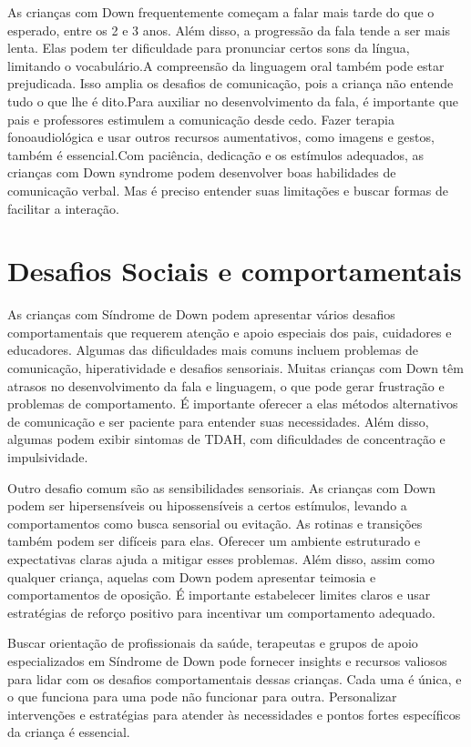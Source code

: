 As crianças com Down frequentemente começam a falar mais tarde do que o esperado, entre os 2 e 3 anos. Além disso, a progressão da fala tende a ser mais lenta. Elas podem ter dificuldade para pronunciar certos sons da língua, limitando o vocabulário.A compreensão da linguagem oral também pode estar prejudicada. Isso amplia os desafios de comunicação, pois a criança não entende tudo o que lhe é dito.Para auxiliar no desenvolvimento da fala, é importante que pais e professores estimulem a comunicação desde cedo. Fazer terapia fonoaudiológica e usar outros recursos aumentativos, como imagens e gestos, também é essencial.Com paciência, dedicação e os estímulos adequados, as crianças com Down syndrome podem desenvolver boas habilidades de comunicação verbal. Mas é preciso entender suas limitações e buscar formas de facilitar a interação.

\section{Desafios Sociais e comportamentais}


As crianças com Síndrome de Down podem apresentar vários desafios comportamentais que requerem atenção e apoio especiais dos pais, cuidadores e educadores. Algumas das dificuldades mais comuns incluem problemas de comunicação, hiperatividade e desafios sensoriais. Muitas crianças com Down têm atrasos no desenvolvimento da fala e linguagem, o que pode gerar frustração e problemas de comportamento. É importante oferecer a elas métodos alternativos de comunicação e ser paciente para entender suas necessidades. Além disso, algumas podem exibir sintomas de TDAH, com dificuldades de concentração e impulsividade. 

Outro desafio comum são as sensibilidades sensoriais. As crianças com Down podem ser hipersensíveis ou hipossensíveis a certos estímulos, levando a comportamentos como busca sensorial ou evitação. As rotinas e transições também podem ser difíceis para elas. Oferecer um ambiente estruturado e expectativas claras ajuda a mitigar esses problemas. Além disso, assim como qualquer criança, aquelas com Down podem apresentar teimosia e comportamentos de oposição. É importante estabelecer limites claros e usar estratégias de reforço positivo para incentivar um comportamento adequado.

 Buscar orientação de profissionais da saúde, terapeutas e grupos de apoio especializados em Síndrome de Down pode fornecer insights e recursos valiosos para lidar com os desafios comportamentais dessas crianças. Cada uma é única, e o que funciona para uma pode não funcionar para outra. Personalizar intervenções e estratégias para atender às necessidades e pontos fortes específicos da criança é essencial.

